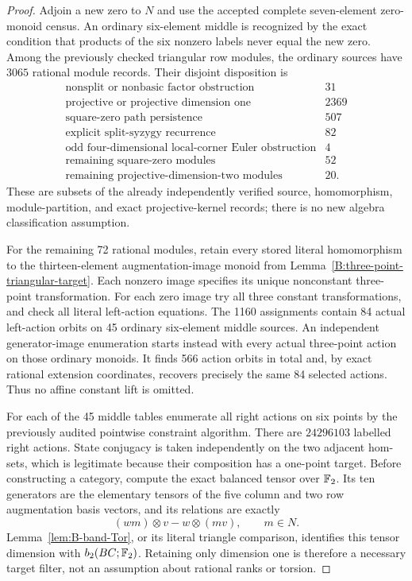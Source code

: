 \begin{proof}
Adjoin a new zero to $N$ and use the accepted complete seven-element
zero-monoid census.  An ordinary six-element middle is recognized by
the exact condition that products of the six nonzero labels never
equal the new zero.  Among the previously checked triangular row
modules, the ordinary sources have $3065$ rational module records.
Their disjoint disposition is
\[
 \begin{array}{l|r}
 \text{nonsplit or nonbasic factor obstruction}&31\\
 \text{projective or projective dimension one}&2369\\
 \text{square-zero path persistence}&507\\
 \text{explicit split-syzygy recurrence}&82\\
 \text{odd four-dimensional local-corner Euler obstruction}&4\\
 \text{remaining square-zero modules}&52\\
 \text{remaining projective-dimension-two modules}&20.
 \end{array}
\]
These are subsets of the already independently verified source,
homomorphism, module-partition, and exact projective-kernel records;
there is no new algebra classification assumption.

For the remaining 72 rational modules, retain every stored literal
homomorphism to the thirteen-element augmentation-image monoid from
Lemma~\ref{B:three-point-triangular-target}.  Each nonzero image
specifies its unique nonconstant three-point transformation.
For each zero image try all three constant transformations, and check
all literal left-action equations.  The 1160 assignments contain
84 actual left-action orbits on 45 ordinary six-element middle
sources.  An independent generator-image enumeration starts instead
with every actual three-point action on those ordinary monoids.
It finds 566 action orbits in total and, by exact rational extension
coordinates, recovers precisely the same 84 selected actions.
Thus no affine constant lift is omitted.

For each of the 45 middle tables enumerate all right actions on six
points by the previously audited pointwise constraint algorithm.
There are $24296103$ labelled right actions.  State conjugacy is taken
independently on the two adjacent hom-sets, which is legitimate
because their composition has a one-point target.
Before constructing a category, compute the exact balanced tensor
over $\mathbb F_2$.  Its ten generators are the elementary tensors of the
five column and two row augmentation basis vectors, and its relations
are exactly
\[
 (w m)\otimes v-w\otimes(mv),\qquad m\in N.
\]
Lemma~\ref{lem:B-band-Tor}, or its literal triangle comparison,
identifies this tensor dimension with $b_2(BC;\mathbb F_2)$.
Retaining only dimension one is therefore a necessary target filter,
not an assumption about rational ranks or torsion.


\end{proof}
